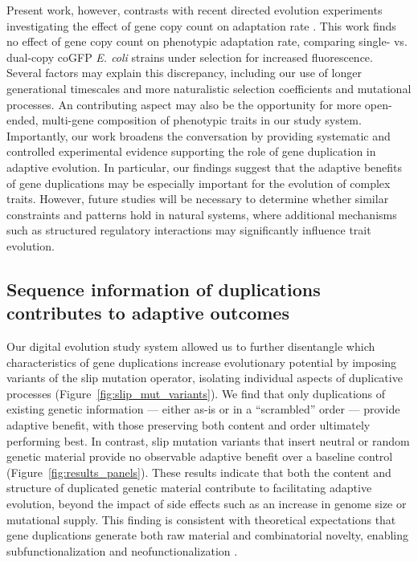 Present work, however, contrasts with recent directed evolution experiments investigating the effect of gene copy count on adaptation rate \citep{mihajlovic2025direct}.
This work finds no effect of gene copy count on phenotypic adaptation rate, comparing single- vs. dual-copy coGFP \textit{E. coli} strains under selection for increased fluorescence.
Several factors may explain this discrepancy, including our use of longer generational timescales and more naturalistic selection coefficients and mutational processes.
An contributing aspect may also be the opportunity for more open-ended, multi-gene composition of phenotypic traits in our study system.
Importantly, our work broadens the conversation by providing systematic and controlled experimental evidence supporting the role of gene duplication in adaptive evolution.
In particular, our findings suggest that the adaptive benefits of gene duplications may be especially important for the evolution of complex traits.
However, future studies will be necessary to determine whether similar constraints and patterns hold in natural systems, where additional mechanisms such as structured regulatory interactions may significantly influence trait evolution.

\subsection{Sequence information of duplications contributes to adaptive outcomes}

Our digital evolution study system allowed us to further disentangle which characteristics of gene duplications increase evolutionary potential by imposing variants of the slip mutation operator, isolating individual aspects of duplicative processes (Figure~\ref{fig:slip_mut_variants}).
We find that only duplications of existing genetic information --- either as-is or in a ``scrambled'' order --- provide adaptive benefit, with those preserving both content and order ultimately performing best.
In contrast, slip mutation variants that insert neutral or random genetic material provide no observable adaptive benefit over a baseline control (Figure~\ref{fig:results_panels}).
These results indicate that both the content and structure of duplicated genetic material contribute to facilitating adaptive evolution, beyond the impact of side effects such as an increase in genome size or mutational supply.
This finding is consistent with theoretical expectations that gene duplications generate both raw material and combinatorial novelty, enabling subfunctionalization and neofunctionalization \citep{ohno1970evolution,Lynch2000}.

